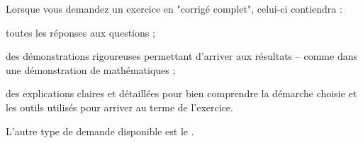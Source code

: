 Lorsque vous demandez un exercice en "corrigé complet", celui-ci contiendra :
\item toutes les réponses aux questions ;
\item des démonstrations rigoureuses permettant d'arriver aux résultats -- comme dans une démonstration de mathématiques ;
\item des explications claires et détaillées pour bien comprendre la démarche choisie et les outils utilisés pour arriver au terme de l'exercice.

L'autre type de demande disponible est le .